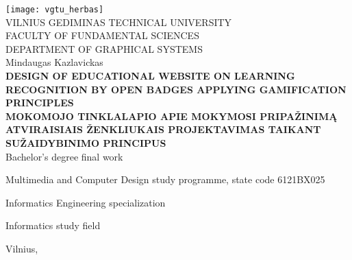 \begin{titlepage}
\setcounter{page}{-2}
\centering
%
\texttt{[image: vgtu\_herbas]}\\[0.5\baselineskip]
%
{\Large\scshape VILNIUS GEDIMINAS TECHNICAL UNIVERSITY}\\[0.15\baselineskip]
{\scshape FACULTY OF FUNDAMENTAL SCIENCES}\\[0.15\baselineskip]
{\scshape DEPARTMENT OF GRAPHICAL SYSTEMS}\\[1.0\baselineskip]
%
\vspace{\fill}
%
{Mindaugas Kazlavickas}\\[3.0\baselineskip]
\MakeUppercase{\Large\bfseries Design of educational website on learning recognition by open badges applying gamification principles}\\[1.0\baselineskip]
\MakeUppercase{\Large\bfseries Mokomojo tinklalapio apie mokymosi pripažinimą atviraisiais ženkliukais projektavimas taikant sužaidybinimo principus}\\[0.3\baselineskip]

{Bachelor's degree final work}

\vspace{\fill}

Multimedia and Computer Design study programme, state code 6121BX025

Informatics Engineering specialization

Informatics study field


\vspace{\fill}
%
Vilnius, \the\year
\end{titlepage}